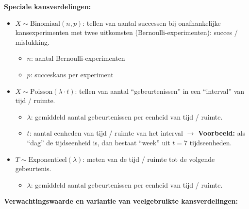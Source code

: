 \textbf{Speciale kansverdelingen:}
\begin{itemize}
    \item $X \sim \text{Binomiaal}(n, p)$: tellen van aantal successen bij onafhankelijke kansexperimenten met twee uitkomsten (Bernoulli-experimenten): succes / mislukking.
    \begin{itemize}
        \item $n$: aantal Bernoulli-experimenten
        \item $p$: succeskans per experiment
    \end{itemize}
    \item $X \sim \text{Poisson}(\lambda \cdot t)$: tellen van aantal ``gebeurtenissen'' in een ``interval'' van tijd / ruimte.
    \begin{itemize}
        \item $\lambda$: gemiddeld aantal gebeurtenissen per eenheid van tijd / ruimte.  
        \item $t$: aantal eenheden van tijd / ruimte van het interval
        $\rightarrow$ \textbf{Voorbeeld:} als ``dag'' de tijdseenheid is, dan bestaat ``week'' uit $t=7$ tijdseenheden. 
    \end{itemize}
    \item $T \sim \text{Exponentieel}(\lambda)$: meten van de tijd / ruimte tot de volgende gebeurtenis.
    \begin{itemize}
        \item $\lambda$: gemiddeld aantal gebeurtenissen per eenheid van tijd / ruimte.  
    \end{itemize}
\end{itemize}
\newpage
\textbf{Verwachtingswaarde en variantie van veelgebruikte kansverdelingen:}
